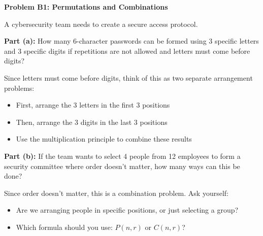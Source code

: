 \documentclass[
  11pt,
]{article}
\begin{document}
\textbf{Problem B1: Permutations and Combinations}

A cybersecurity team needs to create a secure access protocol.

\textbf{Part (a):} How many 6-character passwords can be formed using 3
specific letters and 3 specific digits if repetitions are not allowed
and letters must come before digits?

\begin{tcolorbox}[enhanced jigsaw, coltitle=black, left=2mm, opacityback=0, colframe=quarto-callout-tip-color-frame, toprule=.15mm, colbacktitle=quarto-callout-tip-color!10!white, bottomtitle=1mm, title=\textcolor{quarto-callout-tip-color}{\faLightbulb}\hspace{0.5em}{Tip}, titlerule=0mm, toptitle=1mm, opacitybacktitle=0.6, arc=.35mm, rightrule=.15mm, bottomrule=.15mm, breakable, colback=white, leftrule=.75mm]

Since letters must come before digits, think of this as two separate
arrangement problems:

\begin{itemize}
\item
  First, arrange the 3 letters in the first 3 positions
\item
  Then, arrange the 3 digits in the last 3 positions
\item
  Use the multiplication principle to combine these results
\end{itemize}

\end{tcolorbox}

\textbf{Part (b):} If the team wants to select 4 people from 12
employees to form a security committee where order doesn't matter, how
many ways can this be done?

\begin{tcolorbox}[enhanced jigsaw, coltitle=black, left=2mm, opacityback=0, colframe=quarto-callout-tip-color-frame, toprule=.15mm, colbacktitle=quarto-callout-tip-color!10!white, bottomtitle=1mm, title=\textcolor{quarto-callout-tip-color}{\faLightbulb}\hspace{0.5em}{Tip}, titlerule=0mm, toptitle=1mm, opacitybacktitle=0.6, arc=.35mm, rightrule=.15mm, bottomrule=.15mm, breakable, colback=white, leftrule=.75mm]

Since order doesn't matter, this is a combination problem. Ask yourself:

\begin{itemize}
\item
  Are we arranging people in specific positions, or just selecting a
  group?
\item
  Which formula should you use: \(P(n,r)\) or \(C(n,r)\)?
\end{itemize}

\end{tcolorbox}
\end{document}
